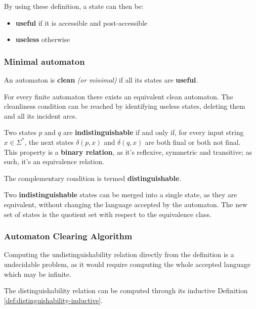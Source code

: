 \documentclass[english]{article}
\begin{document}
By using these definition, a state can then be:
\begin{itemize}
  \item \textbf{useful} if it is accessible and post-accessible
  \item \textbf{useless} otherwise
\end{itemize}

\subsubsection{Minimal automaton}
An automaton is \textbf{clean} \textit{(or minimal)} if all its states are \textbf{useful}.

\begin{property}
  \label{prop:minimal-automaton}
  For every finite automaton there exists an equivalent clean automaton.
  The cleanliness condition can be reached by identifying useless states, deleting them and all its incident arcs.
\end{property}

\begin{definition}
  \label{def:indistinguishable-states}
  Two states \(p\) and \(q\) are \textbf{indistinguishable} if and only if, for every input string \(x \in \Sigma^\ast\), the next states \(\delta(p, x)\) and \(\delta(q, x)\) are both final or both not final.
  This property is a \textbf{binary relation}, as it's reflexive, symmetric and transitive; as such, it's an equivalence relation.

  The complementary condition is termed \textbf{distinguishable}.
\end{definition}

Two \textbf{indistinguishable} states can be merged into a single state, as they are equivalent, without changing the language accepted by the automaton.
The new set of states is the quotient set with respect to the equivalence class.

\subsubsection{Automaton Clearing Algorithm}

Computing the undistinguishability relation directly from the definition is a undecidable problem, as it would require computing the whole accepted language which may be infinite.

The distinguishability relation can be computed through its inductive Definition \ref{def:distinguishability-inductive}.
\end{document}
